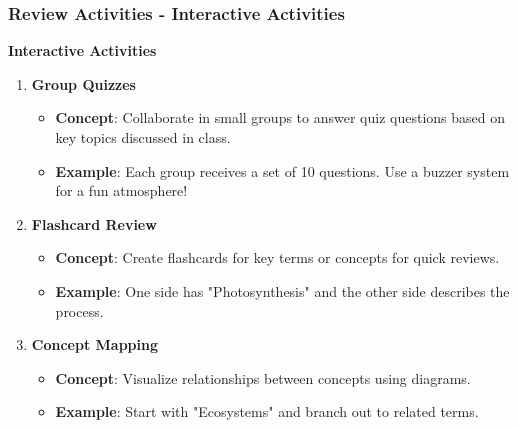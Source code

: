 \documentclass[aspectratio=169]{beamer}
\begin{document}
\begin{frame}[fragile]
    \frametitle{Review Activities - Interactive Activities}
    \textbf{Interactive Activities}
    \begin{enumerate}
        \item \textbf{Group Quizzes}
            \begin{itemize}
                \item \textbf{Concept}: Collaborate in small groups to answer quiz questions based on key topics discussed in class.
                \item \textbf{Example}: Each group receives a set of 10 questions. Use a buzzer system for a fun atmosphere!
            \end{itemize}
        
        \item \textbf{Flashcard Review}
            \begin{itemize}
                \item \textbf{Concept}: Create flashcards for key terms or concepts for quick reviews.
                \item \textbf{Example}: One side has "Photosynthesis" and the other side describes the process.
            \end{itemize}
        
        \item \textbf{Concept Mapping}
            \begin{itemize}
                \item \textbf{Concept}: Visualize relationships between concepts using diagrams.
                \item \textbf{Example}: Start with "Ecosystems" and branch out to related terms.
            \end{itemize}
    \end{enumerate}
\end{frame}
\end{document}
